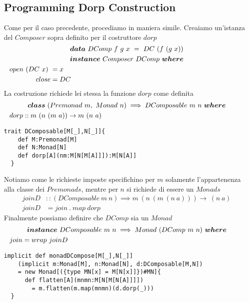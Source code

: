 \subsection{Programming Dorp Construction}
\label{programming_dorp_construction}
Come per il caso precedente, procediamo in maniera simile.
Creaiamo un'istanza del $Composer$ sopra definito per il costruttore $dorp$
\begin{align*}
  \classdef{\bm{data}\ DComp\ f\ g\ x\ =\ DC\ (f\ (g\ x))}
  \classdef{\bm{instance}\ Composer\ DComp\ \bm{where} }
  open\ (DC\ x)\ &= x\\
  close &= DC
\end{align*}
La costruzione richiede lei stessa la funzione $dorp$ come definita
\begin{align*}
  \classdef{\bm{class}\ (Premonad\ m,\ Monad\ n) \implies DComposable\ m\ n\ \bm{where}}
  dorp &:: m\ (n\ (m\ a)) \to m\ (n\ a)
\end{align*}
\begin{lstlisting}[style=myScalastyle, caption=Dorp Constructor]
  trait DComposable[M[_],N[_]]{
    def M:Premonad[M]
    def N:Monad[N]
    def dorp[A](nm:M[N[M[A]]]):M[N[A]]
  }
\end{lstlisting}
Notiamo come le richieste imposte specifichino per $m$ solamente l'appartenenza
alla classe dei $Premonads$, mentre per $n$ si richiede di essere un $Monads$
\begin{align*}
  joinD &:: (DComposable\ m\ n) \implies m\ (n\ (m\ (n\ a))) \to \ (n\ a)\\
  joinD &= join\ .\ map\ dorp
\end{align*}
Finalmente possiamo definire che $DComp$ sia un $Monad$
\begin{align*}
  \classdef{\bm{instance}\ DComposable\ m\ n \implies Monad\ (DComp\ m\ n)\ \bm{where}}
  join &= wrap\ joinD
\end{align*}
\begin{lstlisting}[style=myScalastyle, caption=DComposable is Monad]
  implicit def monadDCompose[M[_],N[_]]
    (implicit m:Monad[M], n:Monad[N], d:DComposable[M,N])
    = new Monad[({type MN[x] = M[N[x]]})#MN]{
      def flatten[A](mnmn:M[N[M[N[A]]]])
        = m.flatten(m.map(mnmn)(d.dorp(_)))
  }
  \end{lstlisting}
\pagebreak
